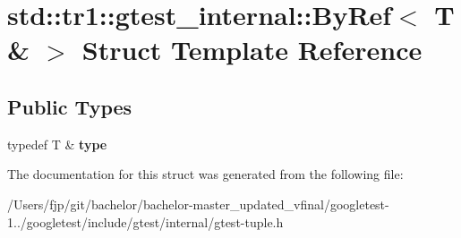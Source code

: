 \hypertarget{structstd_1_1tr1_1_1gtest__internal_1_1_by_ref_3_01_t_01_6_01_4}{}\section{std\+:\+:tr1\+:\+:gtest\+\_\+internal\+:\+:By\+Ref$<$ T \& $>$ Struct Template Reference}
\label{structstd_1_1tr1_1_1gtest__internal_1_1_by_ref_3_01_t_01_6_01_4}
\subsection*{Public Types}
\begin{DoxyCompactItemize}
\item 
\mbox{\label{structstd_1_1tr1_1_1gtest__internal_1_1_by_ref_3_01_t_01_6_01_4_a512382574dbdd736320d68e313801122}} 
typedef T \& {\bfseries type}
\end{DoxyCompactItemize}


The documentation for this struct was generated from the following file\+:\begin{DoxyCompactItemize}
\item 
/\+Users/fjp/git/bachelor/bachelor-\/master\+\_\+updated\+\_\+vfinal/googletest-\/1../googletest/include/gtest/internal/gtest-\/tuple.\+h\end{DoxyCompactItemize}
